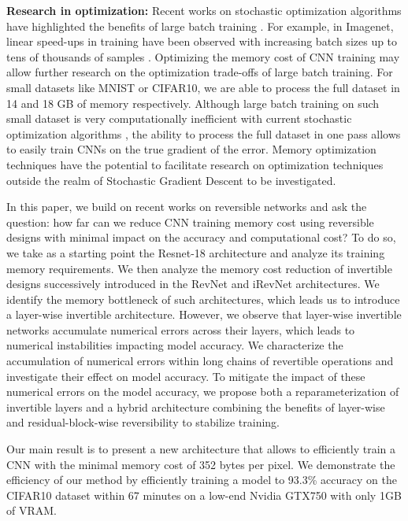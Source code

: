 \documentclass[twocolumn]{bmcart}
\begin{document}
\textbf{Research in optimization:}
Recent works on stochastic optimization algorithms have highlighted the benefits of large batch training \cite{shallue2018measuring,largebatch}.
For example, in Imagenet, linear speed-ups in training have been observed with increasing batch sizes up to tens of thousands of samples \cite{largebatch}.
Optimizing the memory cost of CNN training may allow further research on the optimization trade-offs of large batch training.
For small datasets like MNIST or CIFAR10, we are able to process the full dataset in 14 and 18 GB of memory respectively.
Although large batch training on such small dataset is very computationally inefficient with current stochastic optimization algorithms \cite{largebatch},
the ability to process the full dataset in one pass allows to easily train CNNs on the true gradient of the error.
Memory optimization techniques have the potential to facilitate research on optimization techniques outside the realm of Stochastic Gradient Descent to be investigated.

In this paper, we build on recent works on reversible networks \cite{gomez2017reversible,jacobsen2018revnet} and ask the question: 
how far can we reduce CNN training memory cost using reversible designs with minimal impact on the accuracy and computational cost?
To do so, we take as a starting point the Resnet-18 architecture and analyze its training memory requirements.
We then analyze the memory cost reduction of invertible designs successively introduced in the RevNet and iRevNet architectures.
We identify the memory bottleneck of such architectures, which leads us to introduce a layer-wise invertible architecture.
However, we observe that layer-wise invertible networks accumulate numerical errors across their layers, which leads to numerical instabilities impacting model accuracy.
We characterize the accumulation of numerical errors within long chains of revertible operations and investigate their effect on model accuracy.
To mitigate the impact of these numerical errors on the model accuracy, we propose both a reparameterization of invertible layers and a hybrid architecture combining the benefits of layer-wise and residual-block-wise reversibility to stabilize training.

Our main result is to present a new architecture that allows to efficiently train a CNN with the minimal memory cost of 352 bytes per pixel.
We demonstrate the efficiency of our method by efficiently training a model to 93.3\% accuracy on the CIFAR10 dataset within 67 minutes on a low-end Nvidia GTX750 with only 1GB of VRAM.
\end{document}
